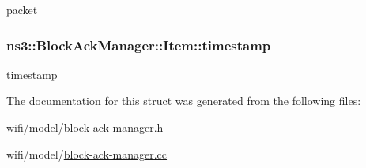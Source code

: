 packet 

\subsubsection[{\texorpdfstring{timestamp}{timestamp}}]{ ns3\+::\+Block\+Ack\+Manager\+::\+Item\+::timestamp}\hypertarget{structns3_1_1BlockAckManager_1_1Item_a07d95bde0158a3f6084b989ddbc2c150}{}\label{structns3_1_1BlockAckManager_1_1Item_a07d95bde0158a3f6084b989ddbc2c150}


timestamp 



The documentation for this struct was generated from the following files\+:\begin{DoxyCompactItemize}
\item 
wifi/model/\hyperlink{block-ack-manager_8h}{block-\/ack-\/manager.\+h}\item 
wifi/model/\hyperlink{block-ack-manager_8cc}{block-\/ack-\/manager.\+cc}\end{DoxyCompactItemize}
